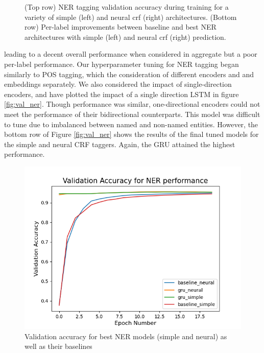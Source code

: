 \documentclass[11pt,a4paper]{article}
\begin{document}
\begin{figure}[h!]
\begin{tabular}{cc}
  \end{tabular}
  \caption{(Top row) NER tagging validation accuracy during training for a variety of 
    simple (left) and neural crf (right) architectures. (Bottom row) Per-label improvements 
    between baseline and best NER architectures with simple (left) and neural crf (right) 
  prediction.}
\end{figure}
\label{fig:val_ner}
\FloatBarrier

 leading to a decent overall performance when considered in aggregate but a poor per-label performance. Our hyperparameter tuning for NER tagging began similarly to POS tagging, which the consideration of different encoders and and embeddings separately. We also considered the impact of single-direction encoders, and have plotted the impact of a single direction LSTM in figure \ref{fig:val_ner}. Though performance was similar, one-directional encoders could not meet the performance of their bidirectional counterparts. This model was difficult to tune due to imbalanced between named and non-named entities. However, the bottom row of Figure \ref{fig:val_ner} shows the results of the final tuned models for the simple and neural CRF taggers. Again, the GRU attained the highest performance.


\begin{figure}[h!]
  \centering
  \includegraphics[width=0.97\linewidth]{imgs/best_NER.png}
  \caption{Validation accuracy for best NER models (simple and neural) as well as their
  baselines}%
  \label{fig:best_ner}
  \vspace{-16pt}
\end{figure}
\end{document}
